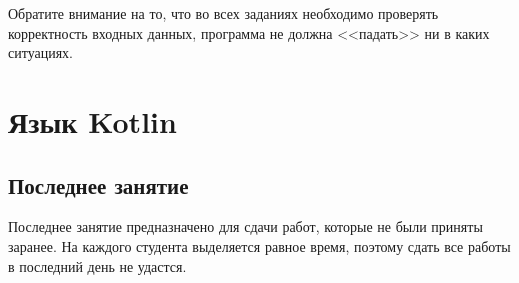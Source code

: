 \documentclass{article}
\begin{document}
Обратите внимание на то, что во всех заданиях необходимо проверять корректность входных данных, программа не должна <<падать>>
ни в каких ситуациях.

\section{Язык Kotlin}
























\subsection{Последнее занятие}

Последнее занятие предназначено для сдачи работ, которые не были приняты заранее. На каждого студента выделяется равное время, поэтому сдать все работы в
последний день не удастся.

%

\end{document}
